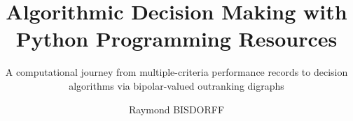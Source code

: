 \documentclass[12pt,envcountchap,sectrefs,english]{svmono}
\begin{document}
\author{Raymond BISDORFF}
\title{Algorithmic Decision Making with Python Programming Resources}
\subtitle{A computational journey from multiple-criteria performance records to decision algorithms via bipolar-valued outranking digraphs}
\maketitle

\frontmatter%




\tableofcontents

%

\mainmatter%
\setlength{\tabcolsep}{0.5em}
\lstset{style=pythonstyle}


       



























\end{document}
